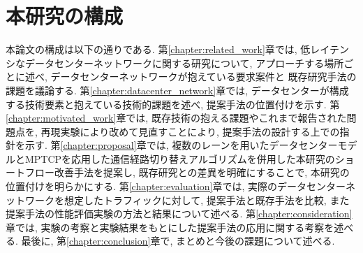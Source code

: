 \section{本研究の構成}
本論文の構成は以下の通りである. 
第\ref{chapter:related_work}章では, 低レイテンシなデータセンターネットワークに関する研究について, アプローチする場所ごとに述べ,
データセンターネットワークが抱えている要求案件と 既存研究手法の課題を議論する. 
第\ref{chapter:datacenter_network}章では, データセンターが構成する技術要素と抱えている技術的課題を述べ,
提案手法の位置付けを示す. 
第\ref{chapter:motivated_work}章では, 既存技術の抱える課題やこれまで報告された問題点を, 再現実験により改めて見直すことにより,
提案手法の設計する上での指針を示す. 
第\ref{chapter:proposal}章では,
複数のレーンを用いたデータセンターモデルとMPTCPを応用した通信経路切り替えアルゴリズムを併用した本研究のショートフロー改善手法を提案し, 既存研究との差異を明確にすることで, 本研究の位置付けを明らかにする. 
第\ref{chapter:evaluation}章では, 実際のデータセンターネットワークを想定したトラフィックに対して, 提案手法と既存手法を比較,
また提案手法の性能評価実験の方法と結果について述べる. 
第\ref{chapter:consideration}章では, 実験の考察と実験結果をもとにした提案手法の応用に関する考察を述べる. 
最後に, 第\ref{chapter:conclusion}章で, まとめと今後の課題について述べる. 
